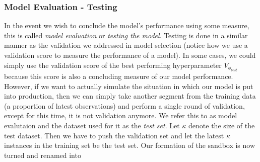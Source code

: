 \subsubsection{Model Evaluation - Testing}
In the event we wish to conclude the model's performance using some measure, this is called \textit{model evaluation} or \textit{testing the model}. Testing is done in a similar manner as the validation we addressed in model selection (notice how we use a validation score to measure the performance of a model). In some cases, we could simply use the validation score of the best performing hyperparameter $V_{\phi_{best}}$ because this score is also a concluding measure of our model performance. However, if we want to actually simulate the situation in which our model is put into production, then we can simply take another segment from the training data (a proportion of latest observations) and perform a single round of validation, except for this time, it is not validation anymore. We refer this to as model evalutaion and the dataset used for it as the \textit{test set}. Let $\kappa$ denote the size of the test dataset. Then we have to push the validation set and let the latest $\kappa$ instances in the training set be the test set. Our formation of the sandbox is now turned and renamed into
